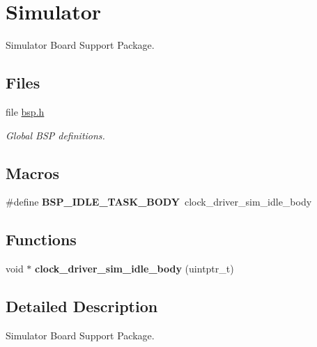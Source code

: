 \hypertarget{group__RTEMSBSPsMoxieMoxieSim}{}\section{Simulator}
\label{group__RTEMSBSPsMoxieMoxieSim}


Simulator Board Support Package.  


\subsection*{Files}
\begin{DoxyCompactItemize}
\item 
file \mbox{\hyperlink{bsps_2moxie_2moxiesim_2include_2bsp_8h}{bsp.\+h}}
\begin{DoxyCompactList}\small\item\em Global B\+SP definitions. \end{DoxyCompactList}\end{DoxyCompactItemize}
\subsection*{Macros}
\begin{DoxyCompactItemize}
\item 
\mbox{\label{group__RTEMSBSPsMoxieMoxieSim_ga4aa606d0badadcc28e8054cb60f13b56}} 
\#define {\bfseries B\+S\+P\+\_\+\+I\+D\+L\+E\+\_\+\+T\+A\+S\+K\+\_\+\+B\+O\+DY}~clock\+\_\+driver\+\_\+sim\+\_\+idle\+\_\+body
\end{DoxyCompactItemize}
\subsection*{Functions}
\begin{DoxyCompactItemize}
\item 
\mbox{\label{group__RTEMSBSPsMoxieMoxieSim_ga44e69833220d6f060ab637fd7f53ca26}} 
void $\ast$ {\bfseries clock\+\_\+driver\+\_\+sim\+\_\+idle\+\_\+body} (uintptr\+\_\+t)
\end{DoxyCompactItemize}


\subsection{Detailed Description}
Simulator Board Support Package. 

